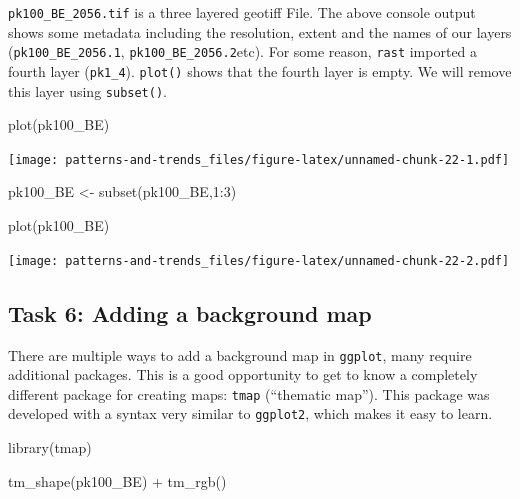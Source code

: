 \documentclass[
]{book}
\newenvironment{Shaded}{\begin{snugshade}}{\end{snugshade}}
\newcommand{\DecValTok}[1]{\textcolor[rgb]{0.00,0.00,0.81}{#1}}
\newcommand{\FunctionTok}[1]{\textcolor[rgb]{0.00,0.00,0.00}{#1}}
\newcommand{\NormalTok}[1]{#1}
\newcommand{\OtherTok}[1]{\textcolor[rgb]{0.56,0.35,0.01}{#1}}
\newcommand{\SpecialCharTok}[1]{\textcolor[rgb]{0.00,0.00,0.00}{#1}}
\begin{document}
\texttt{pk100\_BE\_2056.tif} is a three layered geotiff File. The above console output shows some metadata including the resolution, extent and the names of our layers (\texttt{pk100\_BE\_2056.1}, \texttt{pk100\_BE\_2056.2}etc). For some reason, \texttt{rast} imported a fourth layer (\texttt{pk1\_4}). \texttt{plot()} shows that the fourth layer is empty. We will remove this layer using \texttt{subset()}.

\begin{Shaded}
\begin{Highlighting}[]

\FunctionTok{plot}\NormalTok{(pk100\_BE)}
\end{Highlighting}
\end{Shaded}

\texttt{[image: patterns-and-trends\_files/figure-latex/unnamed-chunk-22-1.pdf]}

\begin{Shaded}
\begin{Highlighting}[]

\NormalTok{pk100\_BE }\OtherTok{\textless{}{-}} \FunctionTok{subset}\NormalTok{(pk100\_BE,}\DecValTok{1}\SpecialCharTok{:}\DecValTok{3}\NormalTok{)}

\FunctionTok{plot}\NormalTok{(pk100\_BE)}
\end{Highlighting}
\end{Shaded}

\texttt{[image: patterns-and-trends\_files/figure-latex/unnamed-chunk-22-2.pdf]}

\hypertarget{task-6-adding-a-background-map}{%
\subsection{Task 6: Adding a background map}\label{task-6-adding-a-background-map}}

There are multiple ways to add a background map in \texttt{ggplot}, many require additional packages. This is a good opportunity to get to know a completely different package for creating maps: \texttt{tmap} (``thematic map''). This package was developed with a syntax very similar to \texttt{ggplot2}, which makes it easy to learn.

\begin{Shaded}
\begin{Highlighting}[]
\FunctionTok{library}\NormalTok{(tmap)}

\FunctionTok{tm\_shape}\NormalTok{(pk100\_BE) }\SpecialCharTok{+} 
  \FunctionTok{tm\_rgb}\NormalTok{() }
\end{Highlighting}
\end{Shaded}
\end{document}
